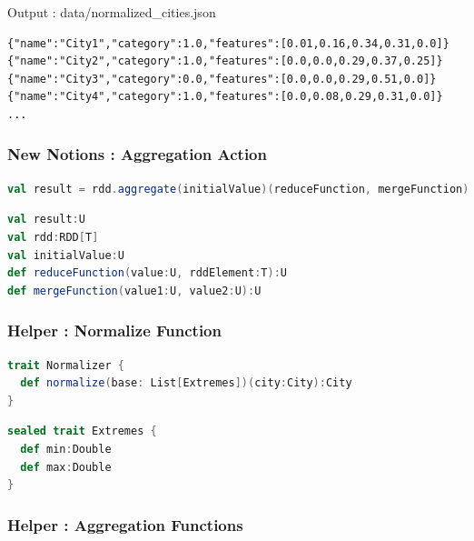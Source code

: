 \documentclass[slidetop,9pt,utf8]{beamer}
\begin{document}
\begin{CJK}{UTF8}{gbsn}
\begin{frame}[fragile]
  \begin{block}{Output : data/normalized\_cities.json}
    \begin{verbatim}
{"name":"City1","category":1.0,"features":[0.01,0.16,0.34,0.31,0.0]}
{"name":"City2","category":1.0,"features":[0.0,0.0,0.29,0.37,0.25]}
{"name":"City3","category":0.0,"features":[0.0,0.0,0.29,0.51,0.0]}
{"name":"City4","category":1.0,"features":[0.0,0.08,0.29,0.31,0.0]}
...
    \end{verbatim}
  \end{block}

\end{frame}

\begin{frame}[fragile]
  \frametitle{New Notions : Aggregation Action}


  \begin{lstlisting}[label=Aggregate, caption=Aggregation over an RDD, language=scala, style=code]
val result = rdd.aggregate(initialValue)(reduceFunction, mergeFunction)
  \end{lstlisting}


  \begin{lstlisting}[label=AggregateType, caption=Types over aggregate, language=scala, style=code]
val result:U
val rdd:RDD[T]
val initialValue:U
def reduceFunction(value:U, rddElement:T):U
def mergeFunction(value1:U, value2:U):U
  \end{lstlisting}

\end{frame}

\begin{frame}[fragile]
  \frametitle{Helper : Normalize Function}

\begin{lstlisting}[label=NormalizerTrait, caption=Normalizer Trait, language=scala, style=code]
trait Normalizer {
  def normalize(base: List[Extremes])(city:City):City
}
  \end{lstlisting}

  \begin{lstlisting}[label=ExtremesTrait, caption=Extremes Trait, language=scala, style=code]
sealed trait Extremes {
  def min:Double
  def max:Double
}
  \end{lstlisting}

\end{frame}

\begin{frame}[fragile]
  \frametitle{Helper : Aggregation Functions}


\end{frame}
\end{CJK}
\end{document}

